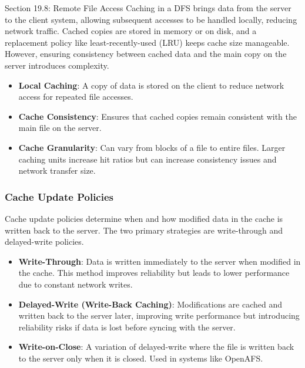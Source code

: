 \begin{notes}{Section 19.8: Remote File Access}
    Caching in a DFS brings data from the server to the client system, allowing subsequent accesses to be handled locally, reducing network traffic. Cached copies are stored in memory or on disk, and 
    a replacement policy like least-recently-used (LRU) keeps cache size manageable. However, ensuring consistency between cached data and the main copy on the server introduces complexity.
    
    \begin{highlight}
    
        \begin{itemize}
            \item \textbf{Local Caching}: A copy of data is stored on the client to reduce network access for repeated file accesses.
            \item \textbf{Cache Consistency}: Ensures that cached copies remain consistent with the main file on the server.
            \item \textbf{Cache Granularity}: Can vary from blocks of a file to entire files. Larger caching units increase hit ratios but can increase consistency issues and network transfer size.
        \end{itemize}
    
    \end{highlight}
    
    \subsubsection*{Cache Update Policies}
    
    Cache update policies determine when and how modified data in the cache is written back to the server. The two primary strategies are write-through and delayed-write policies.
    
    \begin{highlight}
    
        \begin{itemize}
            \item \textbf{Write-Through}: Data is written immediately to the server when modified in the cache. This method improves reliability but leads to lower performance due to constant network writes.
            \item \textbf{Delayed-Write (Write-Back Caching)}: Modifications are cached and written back to the server later, improving write performance but introducing reliability risks if data is 
            lost before syncing with the server.
            \item \textbf{Write-on-Close}: A variation of delayed-write where the file is written back to the server only when it is closed. Used in systems like OpenAFS.
        \end{itemize}
    

\end{highlight}
\end{notes}
